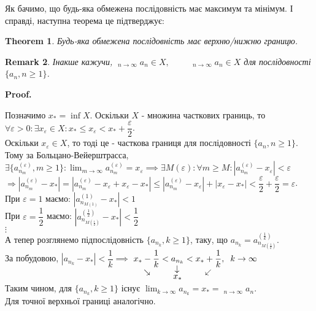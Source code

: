 \documentclass[a4paper, 14pt]{article}
\makeatletter
\DeclareMathOperator*\uplim{\overline{lim}}
\DeclareMathOperator*\downlim{\underline{lim}}
\def\huge{\displaystyle}
\def\qed{$\blacksquare$}
\theoremstyle{theoremdd}
\newtheorem{theorem}{Theorem}[subsection]
\theoremstyle{theoremdd}
\theoremstyle{theoremdd}
\theoremstyle{theoremdd}
\theoremstyle{theoremdd}
\theoremstyle{theoremdd}
\newtheorem{remark}[theorem]{Remark}
\theoremstyle{theoremdd}
\theoremstyle{theoremdd}
\renewenvironment{proof}[1][Proof.\\]{\par
\pushQED{\hfill \qed}%
\normalfont \topsep6\p@\@plus6\p@\relax
\trivlist
\item\relax
{\bfseries
#1\@addpunct{.}}\hspace\labelsep\ignorespaces
}{%
\popQED\endtrivlist\@endpefalse
}
\makeatother
\begin{document}
	Як бачимо, що будь-яка обмежена послідовність має максимум та мінімум. І справді, наступна теорема це підтверджує:
	
	\begin{theorem}
	Будь-яка обмежена послідовність має верхню/нижню границю.
	\end{theorem}
	
	\begin{remark}
	Інакше кажучи, $\huge \uplim_{n \to \infty} a_n \in X, \hspace{1cm} \downlim_{n \to \infty} a_n \in X$ для послідовності $\{a_n, n \geq 1\}$.
	\end{remark}
	
	\begin{proof}
	Позначимо $x_* = \inf X$. Оскільки $X$ - множина часткових границь, то\\
	$\forall \varepsilon > 0: \exists x_{\varepsilon} \in X: x_* \leq x_{\varepsilon} < x_* + \dfrac{\varepsilon}{2}$.\\
	Оскільки $x_\varepsilon \in X$, то тоді це - часткова границя для послідовності $\{a_n, n \geq 1\}$. Тому за Больцано-Вейерштрасса, $\exists \{a_{n_m}^{(\varepsilon)}, m \geq 1\}: \huge \lim_{m \to \infty} a_{n_m}^{(\varepsilon)} = x_{\varepsilon} \implies \exists M(\varepsilon): \forall m \geq M: |a_{n_m}^{(\varepsilon)} - x_{\varepsilon}| < \varepsilon$\\
	$\Rightarrow |a_{n_m}^{(\varepsilon)} - x_*| = |a_{n_m}^{(\varepsilon)} - x_{\varepsilon} + x_{\varepsilon} - x_*| \leq |a_{n_m}^{(\varepsilon)} - x_{\varepsilon}| + |x_{\varepsilon} - x_*| < \dfrac{\varepsilon}{2} + \dfrac{\varepsilon}{2} = \varepsilon$.\\
	При $\varepsilon = 1$ маємо: $|a_{n_{M(1)}}^{(1)} - x_*| < 1$\\
	При $\varepsilon = \dfrac{1}{2}$ маємо: $|a_{n_{M(\frac{1}{2})}}^{(\frac{1}{2})} - x_*| < \dfrac{1}{2}$\\
	$\vdots$\\
	А тепер розглянемо підпослідовність $\{a_{n_k}, k \geq 1\}$, таку, що $a_{n_k} = a_{n_{M(\frac{1}{k})}}^{(\frac{1}{k})}$.\\
	За побудовою, $|a_{n_k} - x_*| < \dfrac{1}{k} \implies$ $\displaystyle \underset{\rotatebox[origin=c]{-45}{$\rightarrow$}}{x_*-\frac{1}{k}} < \underset{\underset{\displaystyle x_*}{\rotatebox[origin=c]{90}{$\leftarrow$}}}{a_{n_k}} < \underset{\rotatebox[origin=c]{45}{$\leftarrow$}}{x_*+\frac{1}{k}}, \hspace{0.2cm} k \to \infty$\\
	Таким чином, для $\{a_{n_k}, k \geq 1\}$ існує $\huge \lim_{k \to \infty} a_{n_k} = x_* = \downlim_{n \to \infty} a_n$.
	\bigskip \\
	Для точної верхньої границі аналогічно.
	\end{proof}
	
\end{document}
